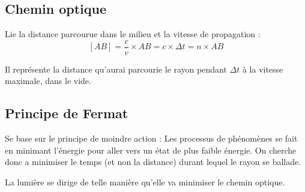\documentclass[french]{yLectureNote}
\begin{document}
	\subsection{Chemin optique}
	Lie la distance parcourue dans le milieu et la vitesse de propagation : \[[AB] = \frac{c}{v} \times AB = c\times \Delta t = n \times AB\]

	Il représente la distance qu'aurai parcourie le rayon pendant $\Delta t$ à la vitesse maximale, dans le vide.
	\subsection{Principe de Fermat}
	Se base sur le principe de moindre action : Les processus de phénomènes se fait en minimant l'énergie pour aller vers un état de plus faible énergie. On cherche donc a minimiser le temps (et non la distance) durant lequel le rayon se ballade.
\begin{theorem}
 La lumière se dirige de telle manière qu'elle va minimiser le chemin optique.
\end{theorem}
\end{document}
